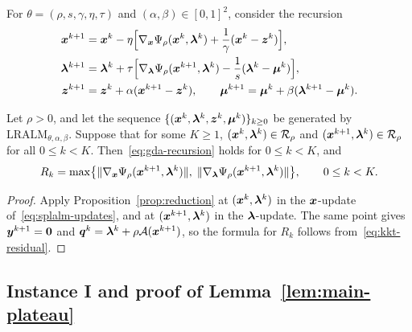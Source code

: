 For \(\theta=(\rho,s,\gamma,\eta,\tau)\) and \((\alpha,\beta)\in[0,1]^2\), consider
the recursion
\begin{equation}\label{eq:gda-recursion}
\begin{aligned}
\bm{x}^{k+1}&=\bm{x}^k-\eta\Bigl[\nabla_{\bm{x}}\Psi_\rho(\bm{x}^k,\bm{\lambda}^k)
  +\frac{1}{\gamma}(\bm{x}^k-\bm{z}^k)\Bigr],\\
\bm{\lambda}^{k+1}&=\bm{\lambda}^k+\tau\Bigl[\nabla_{\bm{\lambda}}\Psi_\rho(\bm{x}^{k+1},\bm{\lambda}^k)
  -\frac{1}{s}(\bm{\lambda}^k-\bm{\mu}^k)\Bigr],\\
\bm{z}^{k+1}&=\bm{z}^k+\alpha(\bm{x}^{k+1}-\bm{z}^k),\qquad
\bm{\mu}^{k+1}=\bm{\mu}^k+\beta(\bm{\lambda}^{k+1}-\bm{\mu}^k).
\end{aligned}
\end{equation}

\begin{proposition}
\label{prop:embedding}
Let \(\rho>0\), and let the sequence
\(\{(\bm{x}^k,\bm{\lambda}^k,\bm{z}^k,\bm{\mu}^k)\}_{k\ge0}\) be generated by
\(\mathrm{LRALM}_{\theta,\alpha,\beta}\). Suppose that for some \(K\ge1\),
\((\bm{x}^k,\bm{\lambda}^k)\in\mathcal R_\rho\) and
\((\bm{x}^{k+1},\bm{\lambda}^k)\in\mathcal R_\rho\) for all \(0\le k<K\).
Then~\eqref{eq:gda-recursion} holds for \(0\le k<K\), and
\[
R_k=\max\bigl\{\|\nabla_{\bm{x}}\Psi_\rho(\bm{x}^{k+1},\bm{\lambda}^k)\|,\;
\|\nabla_{\bm{\lambda}}\Psi_\rho(\bm{x}^{k+1},\bm{\lambda}^k)\|\bigr\},
\qquad 0\le k<K.
\]
\end{proposition}

\begin{proof}
Apply Proposition~\ref{prop:reduction} at \((\bm{x}^k,\bm{\lambda}^k)\) in the
\(\bm{x}\)-update of~\eqref{eq:splalm-updates}, and at \((\bm{x}^{k+1},\bm{\lambda}^k)\) in
the \(\bm{\lambda}\)-update. The same point gives \(\bm{y}^{k+1}=\bm{0}\) and
\(\bm{q}^k=\bm{\lambda}^k+\rho\mathcal{A}(\bm{x}^{k+1})\), so the formula for \(R_k\) follows
from~\eqref{eq:kkt-residual}.
\end{proof}


\subsection{Instance I and proof of Lemma~\ref{lem:main-plateau}}
\label{subsec:lb-plateau}


